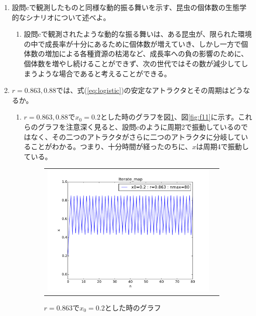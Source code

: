 \documentclass{jsarticle}
\begin{document}
\begin{enumerate}
\begin{enumerate}
\begin{figure}[H]
\begin{center}
\begin{tabular}{cc}
    \end{tabular}
    \end{center}
    \end{figure}   
  \end{enumerate}
  
 \item 設問cで観測したものと同様な動的振る舞いを示す、昆虫の個体数の生態学的なシナリオについて述べよ。
 
  \begin{enumerate}
   \item 設問cで観測されたような動的な振る舞いは、ある昆虫が、限られた環境の中で成長率が十分にあるために個体数が増えていき、しかし一方で個体数の増加による各種資源の枯渇など、成長率への負の影響のために、個体数を増やし続けることができず、次の世代ではその数が減少してしまうような場合であると考えることができる。
  \end{enumerate}
  
 \item $r=0.863, 0.88$では、式(\ref{eq:logistic})の安定なアトラクタとその周期はどうなるか。
 
  \begin{enumerate}
   \item $r=0.863, 0.88$で$x_{0}=0.2$とした時のグラフを図\ref{fig:f10}、図\ref{fig:f11}に示す。これらのグラフを注意深く見ると、設問cのように周期2で振動しているのではなく、その二つのアトラクタがさらに二つのアトラクタに分岐していることがわかる。つまり、十分時間が経ったのちに、$x$は周期4で振動している。
   \begin{figure}[H]
   \begin{center}
    \begin{tabular}{cc}
    
      \begin{minipage}{0.5\hsize}
	\begin{center}
	  \includegraphics[width=8.5cm]{figure_10.pdf}
	  \caption{$r=0.863$で$x_{0}=0.2$とした時のグラフ}
	  \label{fig:f10}
	\end{center}
      \end{minipage}
      

\end{tabular}
\end{center}
\end{figure}
\end{enumerate}
\end{enumerate}
\end{document}
